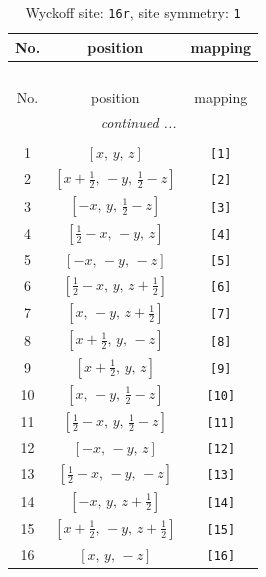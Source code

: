 \documentclass[fleqn,8pt]{jsarticle}
\begin{document}
\begin{longtable}{ccc}
\caption{Wyckoff site: {\tt 16r}, site symmetry: {\tt 1}}
 \\
 \hline \hline
No. & position & mapping \\ \hline \endfirsthead

\multicolumn{2}{l}{\tablename\ \thetable{}} \\
 \hline \hline
No. & position & mapping \\ \hline \endhead

 \hline \hline
\multicolumn{2}{r}{\footnotesize\it continued ...} \\ \endfoot

 \hline \hline
\multicolumn{2}{r}{} \\ \endlastfoot

1 & $\left[ x,\, y,\, z \right]$ & {\tt [1]} \\ \hline
2 & $\left[ x + \frac{1}{2},\, - y,\, \frac{1}{2} - z \right]$ & {\tt [2]} \\ \hline
3 & $\left[ - x,\, y,\, \frac{1}{2} - z \right]$ & {\tt [3]} \\ \hline
4 & $\left[ \frac{1}{2} - x,\, - y,\, z \right]$ & {\tt [4]} \\ \hline
5 & $\left[ - x,\, - y,\, - z \right]$ & {\tt [5]} \\ \hline
6 & $\left[ \frac{1}{2} - x,\, y,\, z + \frac{1}{2} \right]$ & {\tt [6]} \\ \hline
7 & $\left[ x,\, - y,\, z + \frac{1}{2} \right]$ & {\tt [7]} \\ \hline
8 & $\left[ x + \frac{1}{2},\, y,\, - z \right]$ & {\tt [8]} \\ \hline
9 & $\left[ x + \frac{1}{2},\, y,\, z \right]$ & {\tt [9]} \\ \hline
10 & $\left[ x,\, - y,\, \frac{1}{2} - z \right]$ & {\tt [10]} \\ \hline
11 & $\left[ \frac{1}{2} - x,\, y,\, \frac{1}{2} - z \right]$ & {\tt [11]} \\ \hline
12 & $\left[ - x,\, - y,\, z \right]$ & {\tt [12]} \\ \hline
13 & $\left[ \frac{1}{2} - x,\, - y,\, - z \right]$ & {\tt [13]} \\ \hline
14 & $\left[ - x,\, y,\, z + \frac{1}{2} \right]$ & {\tt [14]} \\ \hline
15 & $\left[ x + \frac{1}{2},\, - y,\, z + \frac{1}{2} \right]$ & {\tt [15]} \\ \hline
16 & $\left[ x,\, y,\, - z \right]$ & {\tt [16]} \\
\end{longtable}
\end{document}

